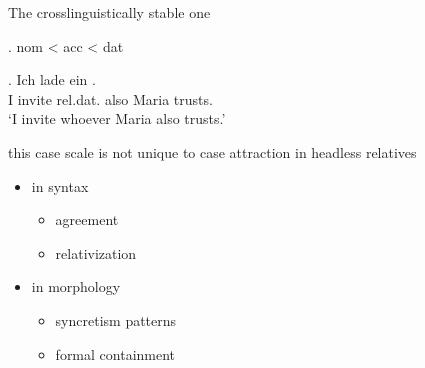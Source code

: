 \documentclass[12pt]{beamer}
\newcommand*{\mybox}[1]{\framebox{#1}} %
\begin{document}
\begin{frame}{The crosslinguistically stable one}

\ex. \ac{nom} < \ac{acc} < \ac{dat}\pause

\exg. Ich {lade ein} \mybox{\tbf{wem}}   . \\
 I invite\scsub{[acc]} \ac{rel}.\ac{dat}. also Maria trusts\scsub{[dat]}.\\
 `I invite whoever Maria also trusts.' \label{ex:mg-acc-dat-rep} \pause

this case scale is not unique to case attraction in headless relatives \pause

\begin{itemize}
  \item in syntax
  \begin{itemize}
    \item agreement \citep[cf.][]{moravcsik1978}
    \item relativization \citep[cf.][]{keenan1977}
  \end{itemize} \pause
  \item in morphology
  \begin{itemize}
    \item syncretism patterns \citep[][cf.]{baerman2005}
    \item formal containment \citep[][cf.]{caha2010}
  \end{itemize}
\end{itemize}


\end{frame}
\end{document}
